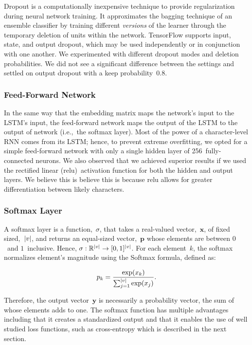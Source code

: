 \documentclass{article}
\DeclarePairedDelimiter\abs{\lvert}{\rvert}%
\begin{document}
Dropout is a computationally inexpensive technique to provide regularization during neural network training.  It approximates the bagging technique of an ensemble classifier by training different \textit{versions} of the learner through the temporary deletion of units within the network.\cite{goodfellow2016}  TensorFlow supports input, state, and output dropout, which may be used independently or in conjunction with one another.  We experimented with different dropout modes and deletion probabilities.  We did not see a significant difference between the settings and settled on output dropout with a keep probability~0.8.

\subsubsection{Feed-Forward Network}

In the same way that the embedding matrix maps the network's input to the LSTM's input, the feed-forward network maps the output of the LSTM to the output of network (i.e.,~the softmax layer).  Most of the power of a character-level RNN comes from its LSTM; hence, to prevent extreme overfitting, we opted for a simple feed-forward network with only a single hidden layer of 256~fully-connected neurons.   We also observed that we achieved superior results if we used the rectified linear (relu)~activation function for both the hidden and output layers.  We believe this is believe this is because relu allows for greater differentiation between likely characters.


\subsubsection{Softmax Layer}

A softmax layer is a function,~$\sigma$, that takes a real-valued vector,~$\mathbf{x}$, of fixed sized,~$\abs*{v}$, and returns an equal-sized vector,~$\mathbf{p}$ whose elements are between $0$~and $1$~inclusive.  Hence, $\sigma : \mathbb{R}^{\abs*{v}} \rightarrow [0,1]^{\abs*{v}}$. For each element~$k$, the softmax normalizes element's magnitude using the Softmax formula, defined as:

\begin{equation}
  p_k = \frac{\exp(x_k)}{\sum_{j=1}^{\abs*{v}} \exp(x_j)}\textrm{.}
\end{equation}

Therefore, the output vector~$\mathbf{y}$ is necessarily a probability vector, the sum of whose elements adds to one. The softmax function has multiple advantages including that it creates a standardized output and that it enables the use of well studied loss functions, such as cross-entropy which is described in the next section.
\end{document}
